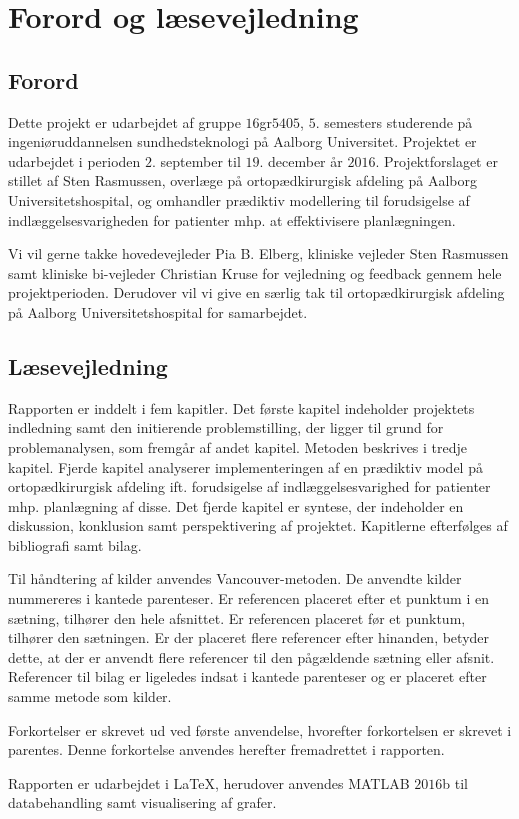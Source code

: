 \chapter*{Forord og læsevejledning}

\section*{Forord}
Dette projekt er udarbejdet af gruppe $16$gr$5405$, $5$. semesters studerende på ingeniøruddannelsen sundhedsteknologi på Aalborg Universitet. Projektet er udarbejdet i perioden $2$. september til $19$. december år $2016$. Projektforslaget er stillet af Sten Rasmussen, overlæge på ortopædkirurgisk afdeling på Aalborg Universitetshospital, og omhandler prædiktiv modellering til forudsigelse af indlæggelsesvarigheden for patienter mhp. at effektivisere planlægningen. 


Vi vil gerne takke hovedevejleder Pia B. Elberg, kliniske vejleder Sten Rasmussen samt kliniske bi-vejleder Christian Kruse for vejledning og feedback gennem hele projektperioden. Derudover vil vi give en særlig tak til ortopædkirurgisk afdeling på Aalborg Universitetshospital for samarbejdet. 


\section*{Læsevejledning}
Rapporten er inddelt i fem kapitler. Det første kapitel indeholder projektets indledning samt den initierende problemstilling, der ligger til grund for problemanalysen, som fremgår af andet kapitel. Metoden beskrives i tredje kapitel. Fjerde kapitel analyserer implementeringen af en prædiktiv model på ortopædkirurgisk afdeling ift. forudsigelse af indlæggelsesvarighed for patienter mhp. planlægning af disse. Det fjerde kapitel er syntese, der indeholder en diskussion, konklusion samt perspektivering af projektet. Kapitlerne efterfølges af bibliografi samt bilag. 


Til håndtering af kilder anvendes Vancouver-metoden. De anvendte kilder nummereres i kantede parenteser. Er referencen placeret efter et punktum i en sætning, tilhører den hele afsnittet. Er referencen placeret før et punktum, tilhører den sætningen. Er der placeret flere referencer efter hinanden, betyder dette, at der er anvendt flere referencer til den pågældende sætning eller afsnit. Referencer til bilag er ligeledes indsat i kantede parenteser og er placeret efter samme metode som kilder. 

Forkortelser er skrevet ud ved første anvendelse, hvorefter forkortelsen er skrevet i parentes. Denne forkortelse anvendes herefter fremadrettet i rapporten. 


Rapporten er udarbejdet i \LaTeX, herudover anvendes MATLAB $2016$b til databehandling samt visualisering af grafer. 
